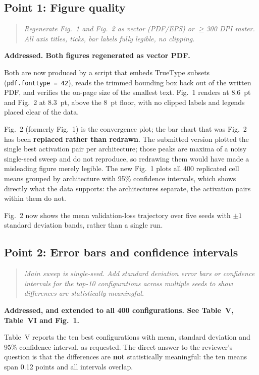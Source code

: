\documentclass[10pt,a4paper]{article}
\newenvironment{rev}%
  {\begin{quote}\itshape\color{quotegray}}%
  {\end{quote}}
\newcommand{\pt}[1]{\textbf{#1}}
\begin{document}
\subsection*{Point 1: Figure quality}

\begin{rev}
Regenerate Fig.~1 and Fig.~2 as vector (PDF/EPS) or $\geq$300 DPI
raster. All axis titles, ticks, bar labels fully legible, no
clipping.
\end{rev}

\noindent\pt{Addressed. Both figures regenerated as vector PDF.}

Both are now produced by a script that embeds TrueType subsets
(\texttt{pdf.fonttype~=~42}), reads the trimmed bounding box back
out of the written PDF, and verifies the on-page size of the
smallest text. Fig.~1 renders at 8.6~pt and Fig.~2 at 8.3~pt, above
the 8~pt floor, with no clipped labels and legends placed clear of
the data.

Fig.~2 (formerly Fig.~1) is the convergence plot; the bar chart that
was Fig.~2 has been \pt{replaced rather than redrawn}. The submitted
version plotted the single best activation pair per architecture;
those peaks are maxima of a noisy single-seed sweep and do not
reproduce, so redrawing them would have made a misleading figure
merely legible. The new Fig.~1 plots all 400 replicated cell means
grouped by architecture with 95\% confidence intervals, which shows
directly what the data supports: the architectures separate, the
activation pairs within them do not.

Fig.~2 now shows the mean validation-loss trajectory over five
seeds with $\pm1$ standard deviation bands, rather than a single
run.

\subsection*{Point 2: Error bars and confidence intervals}

\begin{rev}
Main sweep is single-seed. Add standard deviation error bars or
confidence intervals for the top-10 configurations across multiple
seeds to show differences are statistically meaningful.
\end{rev}

\noindent\pt{Addressed, and extended to all 400 configurations.
See Table~V, Table~VI and Fig.~1.}

Table~V reports the ten best configurations with mean, standard
deviation and 95\% confidence interval, as requested. The direct
answer to the reviewer's question is that the differences are
\pt{not} statistically meaningful: the ten means span 0.12 points
and all intervals overlap.
\end{document}
